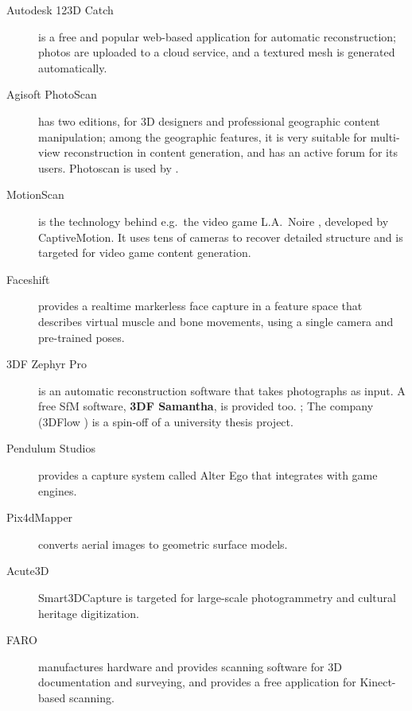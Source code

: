 
\begin{description}
	\item[Autodesk 123D Catch] is a free and popular web-based application for automatic reconstruction; photos are uploaded to a cloud service, and a textured mesh is generated automatically. \cite{autodesk123dcatch}
	\item[Agisoft PhotoScan] has two editions, for 3D designers and professional geographic content manipulation; among the geographic features, it is very suitable for multi-view reconstruction in content generation, and has an active forum for its users. \cite{photoscan} Photoscan is used by \cite{ir-ltd}.
	\item[MotionScan] is the technology behind e.g.\ the video game L.A.\ Noire \cite{rockstar2011noire}, developed by CaptiveMotion. It uses tens of cameras to recover detailed structure and is targeted for video game content generation.
	\item[Faceshift] provides a realtime markerless face capture in a feature space that describes virtual muscle and bone movements, using a single camera and pre-trained poses. \cite{faceshift}
	\item[3DF Zephyr Pro] is an automatic reconstruction software that takes photographs as input. A free SfM software, \textbf{3DF Samantha}, is provided too. \cite{3dfzephyr}; The company (3DFlow \cite{3dflow}) is a spin-off of a university thesis project. \cite{toldo2013accurate,toldo2013towards}
	\item[Pendulum Studios] provides a capture system called Alter Ego that integrates with game engines. \cite{alterego}
	\item[Pix4dMapper] converts aerial images to geometric surface models. \cite{pix4d}
	\item[Acute3D] Smart3DCapture is targeted for large-scale photogrammetry and cultural heritage digitization. \cite{acute3d}
	\item [FARO] manufactures hardware and provides scanning software for 3D documentation and surveying, and provides a free application for Kinect-based scanning. \cite{faro}

\end{description}
